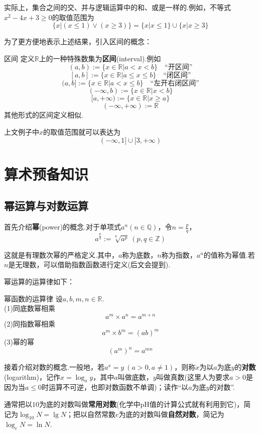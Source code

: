 \documentclass[lang=cn, zihao=5]{elegantbook}
\newcommand{\R}{\mathbb{R}}
\begin{document}
实际上，集合之间的交、并与逻辑运算中的和、或是一样的.例如，不等式$x^2-4x+3 \geq 0$的取值范围为$$\{ x|(x \leq 1) \vee (x \geq 3) \} = \{ x|x \leq 1 \} \cup \{ x|x \geq 3 \}$$

为了更方便地表示上述结果，引入区间的概念：

\begin{definition}{区间}
	定义$\R$上的一种特殊数集为\textbf{区间}(interval).例如 \\
	$$(a,b):=\{ x \in \R | a<x<b \} \quad \textit{“开区间”}$$
	$$[a,b]:=\{ x \in \R | a \leq x \leq b \} \quad \textit{“闭区间”}$$
	$$(a,b]:=\{ x \in \R | a<x \leq b \} \quad \textit{“左开右闭区间”}$$
	$$(-\infty,b):=\{ x \in \R | x<b \}$$
	$$[a,+\infty):=\{ x \in \R | x \geq a \}$$
	$$(-\infty ,+\infty):= \R $$
	其他形式的区间定义相似.
\end{definition}

上文例子中$x$的取值范围就可以表达为$$(-\infty ,1] \cup [3,+\infty )$$


\chapter{算术预备知识}

\section{幂运算与对数运算}

首先介绍\textbf{幂}(power)的概念.对于单项式$a^n(n \in \mathbb{Q})$，令$n=\frac{p}{q}$，
$$a^{\frac{p}{q}}:=\sqrt[q]{a^p} \ (p,q \in \mathbb{Z})$$

这就是有理数次幂的严格定义.其中，$a$称为底数，$n$称为指数，$a^n$的值称为幂值.若$n$是无理数，可以借助指数函数进行定义(后文会提到).

幂运算的运算律如下：

\begin{proposition}{幂函数的运算律}
	设$a,b,m,n \in \R $. \\
	(1)同底数幂相乘$$a^m \times a^n = a^{m+n}$$
	(2)同指数幂相乘$$a^m \times b^m = (ab)^m$$
	(3)幂的幂$$(a^m)^n=a^{mn}$$
\end{proposition}

接着介绍对数的概念.一般地，若$a^x=y~(a>0,a \neq 1)$，则称$x$为以$a$为底$y$的\textbf{对数}(logarithm)，记作$x = \log_{a}{y}$，其中$a$叫做底数，$y$叫做真数(这里人为要求$a>0$是因为当$a\leq 0$时运算不可逆，也即对数函数不单调)；读作“以$a$为底$y$的对数”.

通常把以$10$为底的对数叫做\textbf{常用对数}(化学中pH值的计算公式就有利用到它)，简记为$\log_{10}{N}=\lg N$；把以自然常数$e$为底的对数叫做\textbf{自然对数}，简记为$\log_{e}{N}=\ln N$.
\end{document}
